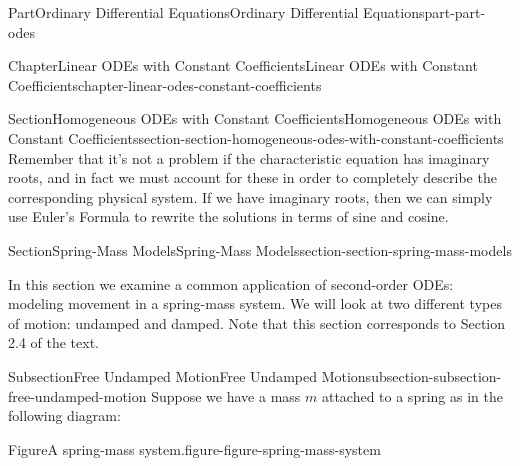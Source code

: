 \documentclass[twoside,10pt,]{book}
\numberwithin{equation}{part}
\begin{document}
\begin{partptx}{Part}{Ordinary Differential Equations}{}{Ordinary Differential Equations}{}{}{part-part-odes}
\begin{chapterptx}{Chapter}{Linear ODEs with Constant Coefficients}{}{Linear ODEs with Constant Coefficients}{}{}{chapter-linear-odes-constant-coefficients}
\begin{sectionptx}{Section}{Homogeneous ODEs with Constant Coefficients}{}{Homogeneous ODEs with Constant Coefficients}{}{}{section-section-homogeneous-odes-with-constant-coefficients}
Remember that it's not a problem if the characteristic equation has imaginary roots, and in fact we must account for these in order to completely describe the corresponding physical system. If we have imaginary roots, then we can simply use Euler's Formula to rewrite the solutions in terms of sine and cosine.%
\end{sectionptx}
%
%
\typeout{************************************************}
\typeout{************************************************}
%
\begin{sectionptx}{Section}{Spring-Mass Models}{}{Spring-Mass Models}{}{}{section-section-spring-mass-models}
\begin{introduction}{}%
In this section we examine a common application of second-order ODEs: modeling movement in a spring-mass system. We will look at two different types of motion: undamped and damped. Note that this section corresponds to Section 2.4 of the text.%
\end{introduction}%
%
%
\typeout{************************************************}
\typeout{************************************************}
%
\begin{subsectionptx}{Subsection}{Free Undamped Motion}{}{Free Undamped Motion}{}{}{subsection-subsection-free-undamped-motion}
Suppose we have a mass \(m\) attached to a spring as in the following diagram:%
\begin{figureptx}{Figure}{A spring-mass system.}{figure-figure-spring-mass-system}{}%
\begin{image}{0}{1}{0}{}%
\end{image}
\end{figureptx}
\end{subsectionptx}
\end{sectionptx}
\end{chapterptx}
\end{partptx}
\end{document}
